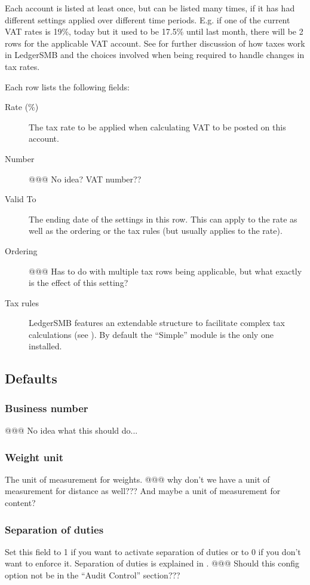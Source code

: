 Each account is listed at least once, but can be listed many times, if it has had different
settings applied over different time periods. E.g. if one of the current VAT rates is 19\%,
today but it used to be 17.5\% until last month, there will be 2 rows for the applicable
VAT account. See  for further discussion of how taxes work in
LedgerSMB and the choices involved when being required to handle changes in tax rates.

Each row lists the following fields:

\begin{description}
\item [Rate (\%)] The tax rate to be applied when calculating VAT to be posted on this account.
\item [Number] @@@ No idea? VAT number??
\item [Valid To] The ending date of the settings in this row. This can apply to the rate as well as the ordering or the tax rules (but usually applies to the rate).
\item [Ordering] @@@ Has to do with multiple tax rows being applicable, but what exactly is the effect of this setting?
\item [Tax rules] LedgerSMB features an extendable structure to facilitate complex tax
calculations (see ). By default the ``Simple'' module
is the only one installed.
\end{description}

\subsection{Defaults}

\subsubsection{Business number}
   @@@ No idea what this should do...
   
\subsubsection{Weight unit}
   The unit of measurement for weights. @@@ why don't we have a unit of measurement for distance as well??? And maybe a unit of measurement for content?
   
\subsubsection{Separation of duties}
   Set this field to 1 if you want to activate separation of duties or to 0 if you don't
   want to enforce it. Separation of duties is explained in . @@@ Should this config option not be in the ``Audit Control'' section???

